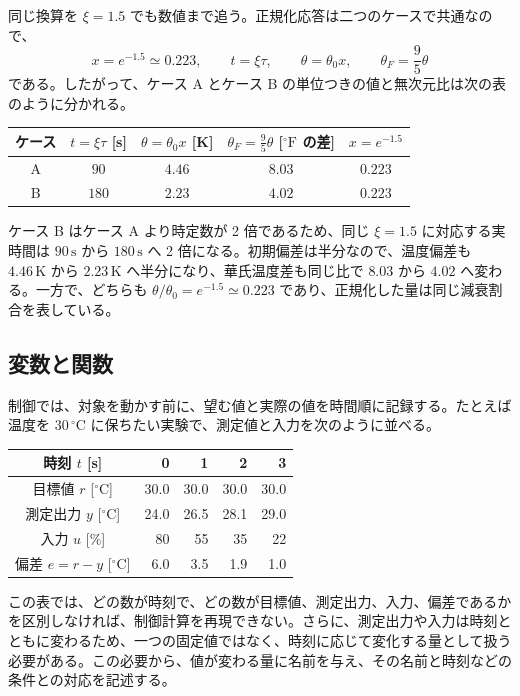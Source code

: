 同じ換算を $\xi=1.5$ でも数値まで追う。正規化応答は二つのケースで共通なので、
\begin{equation}
  x=e^{-1.5}\simeq 0.223,\qquad
  t=\xi\tau,\qquad
  \theta=\theta_0 x,\qquad
  \theta_F=\frac{9}{5}\theta
\end{equation}
である。したがって、ケース A とケース B の単位つきの値と無次元比は次の表のように分かれる。
\begin{center}
\small
\begin{tabular}{c|c|c|c|c}
ケース & $t=\xi\tau$ [s] & $\theta=\theta_0 x$ [K] & $\theta_F=\frac{9}{5}\theta$ [$^\circ\mathrm{F}$ の差] & $x=e^{-1.5}$ \\
\hline
A & $90$ & $4.46$ & $8.03$ & $0.223$ \\
B & $180$ & $2.23$ & $4.02$ & $0.223$
\end{tabular}
\end{center}
ケース B はケース A より時定数が 2 倍であるため、同じ $\xi=1.5$ に対応する実時間は $90\,\mathrm{s}$ から $180\,\mathrm{s}$ へ 2 倍になる。初期偏差は半分なので、温度偏差も $4.46\,\mathrm{K}$ から $2.23\,\mathrm{K}$ へ半分になり、華氏温度差も同じ比で $8.03$ から $4.02$ へ変わる。一方で、どちらも $\theta/\theta_0=e^{-1.5}\simeq 0.223$ であり、正規化した量は同じ減衰割合を表している。

\subsection{変数と関数}

制御では、対象を動かす前に、望む値と実際の値を時間順に記録する。たとえば温度を $30\,^\circ\mathrm{C}$ に保ちたい実験で、測定値と入力を次のように並べる。
\begin{center}
\begin{tabular}{c|rrrr}
時刻 $t$ [s] & 0 & 1 & 2 & 3\\
\hline
目標値 $r$ [$^\circ\mathrm{C}$] & 30.0 & 30.0 & 30.0 & 30.0\\
測定出力 $y$ [$^\circ\mathrm{C}$] & 24.0 & 26.5 & 28.1 & 29.0\\
入力 $u$ [\%] & 80 & 55 & 35 & 22\\
偏差 $e=r-y$ [$^\circ\mathrm{C}$] & 6.0 & 3.5 & 1.9 & 1.0
\end{tabular}
\end{center}
この表では、どの数が時刻で、どの数が目標値、測定出力、入力、偏差であるかを区別しなければ、制御計算を再現できない。さらに、測定出力や入力は時刻とともに変わるため、一つの固定値ではなく、時刻に応じて変化する量として扱う必要がある。この必要から、値が変わる量に名前を与え、その名前と時刻などの条件との対応を記述する。

